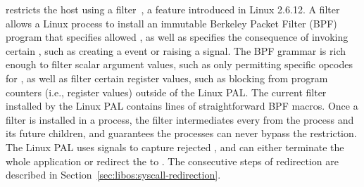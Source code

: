 



\graphene{} restricts the host \linuxapis{} 
using a \seccomp{} %
filter~\cite{seccomp}, a feature introduced in Linux 2.6.12.
A \seccomp{} filter allows a Linux process to install an immutable Berkeley Packet Filter (BPF) program
that specifies allowed \linuxapis{}, as well as specifies
the consequence of invoking certain \linuxapis{}, such as creating a  event or raising a  signal.
The BPF grammar is rich enough to filter scalar argument values,
such as only permitting specific opcodes for ,
as well as filter certain register values, such as blocking \linuxapis{} from program counters (i.e.,  register values) outside of the Linux PAL.
The current \seccomp{} filter installed by the Linux PAL contains \seccomplines{} lines of straightforward BPF macros.  %
Once a \seccomp{} filter is installed in a process,
the filter intermediates
every \linuxapis{} from the process and its future children, and guarantees the processes can never bypass the restriction.
The Linux PAL uses  signals to capture rejected \linuxapis{},
and can either terminate the whole application or
redirect the \linuxapi{} to \thelibos{}.
The consecutive steps of \linuxapi{} redirection are described in Section~\ref{sec:libos:syscall-redirection}.



